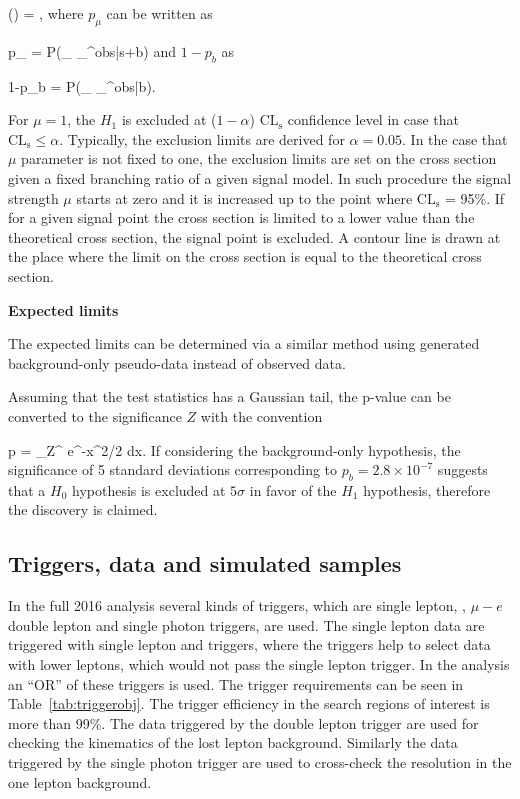 {
(\mu) = ,
}
where $p_{\mu}$ can be written as

{
p_{\mu} = P(_{\mu} \geq {}_{\mu}^{obs}|s+b)
}
and $1-p_{b}$ as

{
1-p_{b} = P(_{\mu} \geq {}_{\mu}^{obs}|b).
}

For $\mu=1$, the $H_{1}$ is excluded at ($1-\alpha$) $\mathrm{CL_{s}}$ confidence level in case that $\mathrm{CL_{s}} \leq \alpha$. Typically, the exclusion limits are derived for $\alpha = 0.05$. In the case that $\mu$ parameter is not fixed to one, the exclusion limits are set on the cross section given a fixed branching ratio of a given signal model. In such procedure the signal strength $\mu$ starts at zero and it is increased up to the point where $\mathrm{CL_{s}}$ = 95\%. If for a given signal point the cross section is limited to a lower value than the theoretical cross section, the signal point is excluded. A contour line is drawn at the place where the limit on the cross section is equal to the theoretical cross section.

\textbf{Expected limits}

The expected limits can be determined via a similar method using generated background-only pseudo-data instead of observed data. 

Assuming that the test statistics has a Gaussian tail, the p-value can be converted to the significance $Z$ with the convention

{
 p = \int_Z^{\infty}  e^{-x^{2}/2} dx.
}
If considering the background-only hypothesis, the significance of 5 standard deviations corresponding to $p_{b} = 2.8 \times 10^{-7} $ suggests that a $H_{0}$ hypothesis is excluded at $5 \sigma$ in favor of the $H_{1}$ hypothesis, therefore the discovery is claimed. %


\subsection{Triggers, data and simulated samples~\label{sec:trigger}}

In the full 2016 analysis several kinds of triggers, which are single lepton, \MET, $\mu-e$ double lepton  and single photon triggers, are used. The single lepton data are triggered with single lepton and \MET triggers, where the \MET triggers help to select data with lower \pt leptons, which would not pass the single lepton trigger. In the analysis an ``OR'' of these triggers is used. The trigger requirements can be seen in Table~\ref{tab:triggerobj}. The trigger efficiency in the search regions of interest is more than 99\%. The data triggered by the double lepton trigger are used for checking the kinematics of the lost lepton background. Similarly the data triggered by the single photon trigger are used to cross-check the \MET resolution in  the one lepton background. 

